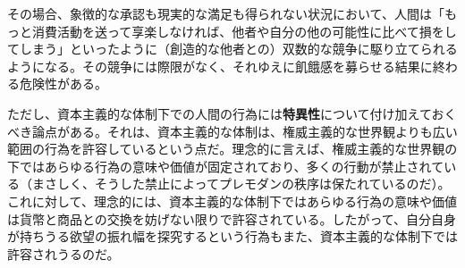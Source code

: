 その場合、象徴的な承認も現実的な満足も得られない状況において、人間は「もっと消費活動を送って享楽しなければ、他者や自分の他の可能性に比べて損をしてしまう」といったように（創造的な他者との）双数的な競争に駆り立てられるようになる。その競争には際限がなく、それゆえに飢餓感を募らせる結果に終わる危険性がある。

ただし、資本主義的な体制下での人間の行為には\textbf{特異性}について付け加えておくべき論点がある。それは、資本主義的な体制は、権威主義的な世界観よりも広い範囲の行為を許容しているという点だ。理念的に言えば、権威主義的な世界観の下ではあらゆる行為の意味や価値が固定されており、多くの行動が禁止されている（まさしく、そうした禁止によってプレモダンの秩序は保たれているのだ）。これに対して、理念的には、資本主義的な体制下ではあらゆる行為の意味や価値は貨幣と商品との交換を妨げない限りで許容されている。したがって、自分自身が持ちうる欲望の振れ幅を探究するという行為もまた、資本主義的な体制下では許容されうるのだ。
